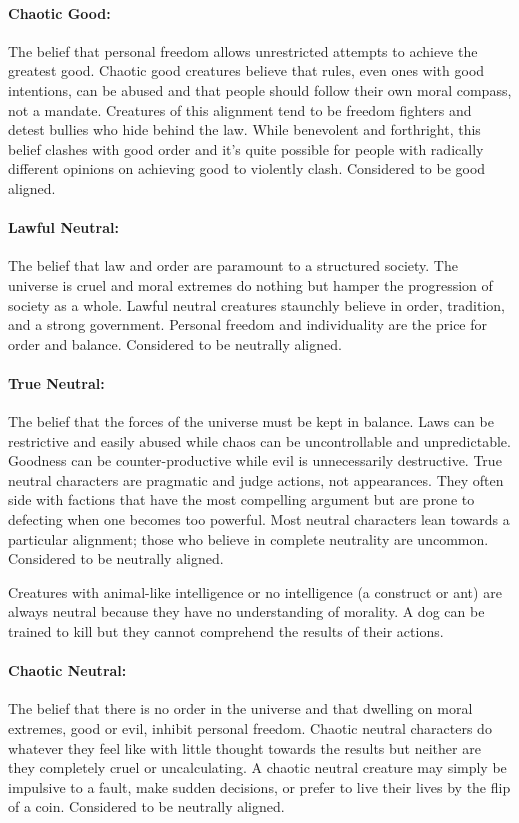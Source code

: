 \begin{multicols}{2}
\paragraph{Chaotic Good:}  The belief that personal freedom allows unrestricted attempts to achieve the greatest good.  Chaotic good creatures believe that rules, even ones with good intentions, can be abused and that people should follow their own moral compass, not a mandate.  Creatures of this alignment tend to be freedom fighters and detest bullies who hide behind the law.  While benevolent and forthright, this belief clashes with good order and it's quite possible for people with radically different opinions on achieving good to violently clash.  Considered to be good aligned.

\paragraph{Lawful Neutral:} The belief that law and order are paramount to a structured society.  The universe is cruel and moral extremes do nothing but hamper the progression of society as a whole.  Lawful neutral creatures staunchly believe in order, tradition, and a strong government.  Personal freedom and individuality are the price for order and balance.  Considered to be neutrally aligned.

\paragraph{True Neutral:} The belief that the forces of the universe must be kept in balance.  Laws can be restrictive and easily abused while chaos can be uncontrollable and unpredictable.  Goodness can be counter-productive while evil is unnecessarily destructive.  True neutral characters are pragmatic and judge actions, not appearances.  They often side with factions that have the most compelling argument but are prone to defecting when one becomes too powerful.  Most neutral characters lean towards a particular alignment; those who believe in complete neutrality are uncommon.  Considered to be neutrally aligned.

Creatures with animal-like intelligence or no intelligence (a construct or ant) are always neutral because they have no understanding of morality.  A dog can be trained to kill but they cannot comprehend the results of their actions.

\paragraph{Chaotic Neutral:}  The belief that there is no order in the universe and that dwelling on moral extremes, good or evil, inhibit personal freedom.  Chaotic neutral characters do whatever they feel like with little thought towards the results but neither are they completely cruel or uncalculating.  A chaotic neutral creature may simply be impulsive to a fault, make sudden decisions, or prefer to live their lives by the flip of a coin.  Considered to be neutrally aligned.


\end{multicols}
